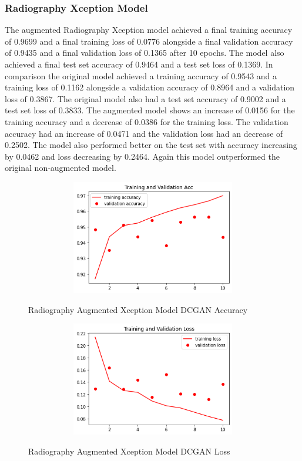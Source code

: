 \subsubsection{Radiography Xception Model}
The augmented Radiography Xception model achieved a final training accuracy of 0.9699 and a final training loss of 0.0776 alongside a final validation accuracy of 0.9435 and a final validation loss of 0.1365 after 10 epochs.  The model also achieved a final test set accuracy of 0.9464 and a test set loss of 0.1369.  In comparison the original model achieved a training accuracy of 0.9543 and a training loss of 0.1162  alongside a validation accuracy of 0.8964 and a validation loss of 0.3867.  The original model also had a test set accuracy of 0.9002 and a test set loss of 0.3833.  The augmented model shows an increase of 0.0156 for the training accuracy and a decrease of 0.0386 for the training loss.  The validation accuracy had an increase of 0.0471 and the validation loss had an decrease of 0.2502. The model also performed better on the test set with  accuracy increasing by 0.0462 and loss decreasing by 0.2464.  Again this model outperformed the original non-augmented model.
 \begin{figure}[H]
    \centering    \includegraphics[width=1\textwidth,height=5cm,keepaspectratio]{Images/RadiographyCNNXceptionTrainAndValAccAugmentedDCGAN.png}\\
    \caption{Radiography Augmented Xception Model DCGAN Accuracy}
    \label{fig:Radiography Augmented Xception Model DCGAN Accuracy}
\end{figure}
 \begin{figure}[H]
    \centering
    \includegraphics[width=1\textwidth,height=5cm,keepaspectratio]{Images/RadiographyCNNXceptionTrainAndValLossAugmentedDCGAN.png}\\
    \caption{Radiography Augmented Xception Model DCGAN Loss}
    \label{fig:Radiography Augmented Xception Model DCGAN Loss}
\end{figure}

